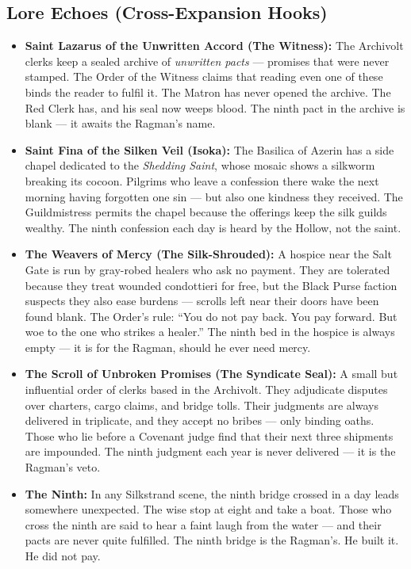 \subsection*{Lore Echoes (Cross-Expansion Hooks)}
\begin{itemize}
  \item \textbf{Saint Lazarus of the Unwritten Accord (The Witness):} The Archivolt clerks keep a sealed archive of \emph{unwritten pacts} --- promises that were never stamped. The Order of the Witness claims that reading even one of these binds the reader to fulfil it. The Matron has never opened the archive. The Red Clerk has, and his seal now weeps blood. The ninth pact in the archive is blank --- it awaits the Ragman's name.
  \item \textbf{Saint Fina of the Silken Veil (Isoka):} The Basilica of Azerin has a side chapel dedicated to the \emph{Shedding Saint}, whose mosaic shows a silkworm breaking its cocoon. Pilgrims who leave a confession there wake the next morning having forgotten one sin --- but also one kindness they received. The Guildmistress permits the chapel because the offerings keep the silk guilds wealthy. The ninth confession each day is heard by the Hollow, not the saint.
  \item \textbf{The Weavers of Mercy (The Silk-Shrouded):} A hospice near the Salt Gate is run by gray-robed healers who ask no payment. They are tolerated because they treat wounded condottieri for free, but the Black Purse faction suspects they also ease burdens --- scrolls left near their doors have been found blank. The Order's rule: ``You do not pay back. You pay forward. But woe to the one who strikes a healer.'' The ninth bed in the hospice is always empty --- it is for the Ragman, should he ever need mercy.
  \item \textbf{The Scroll of Unbroken Promises (The Syndicate Seal):} A small but influential order of clerks based in the Archivolt. They adjudicate disputes over charters, cargo claims, and bridge tolls. Their judgments are always delivered in triplicate, and they accept no bribes --- only binding oaths. Those who lie before a Covenant judge find that their next three shipments are impounded. The ninth judgment each year is never delivered --- it is the Ragman's veto.
  \item \textbf{The Ninth:} In any Silkstrand scene, the ninth bridge crossed in a day leads somewhere unexpected. The wise stop at eight and take a boat. Those who cross the ninth are said to hear a faint laugh from the water --- and their pacts are never quite fulfilled. The ninth bridge is the Ragman's. He built it. He did not pay.
\end{itemize}

